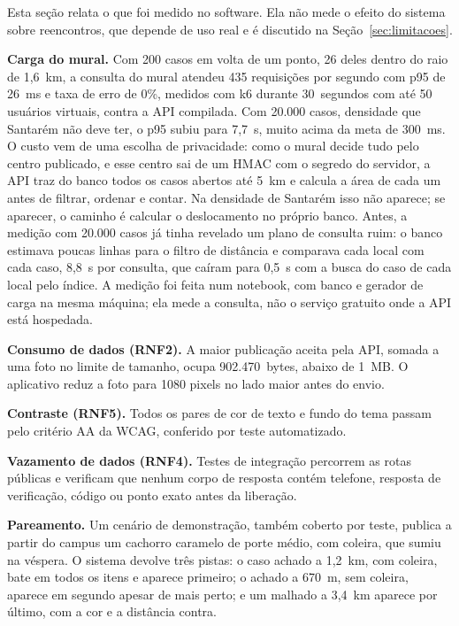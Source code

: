 \documentclass[12pt]{article}
\newcommand{\cargaPnoventaecinco}{26~ms} %
\newcommand{\cargaRequisicoes}{435}
\newcommand{\cargaVintemilPnoventaecinco}{7,7~s}
\newcommand{\cargaErros}{0\%}
\newcommand{\publicacaoBytes}{902.470~bytes}     %
\begin{document}
Esta seção relata o que foi medido no software. Ela não mede o efeito do sistema
sobre reencontros, que depende de uso real e é discutido na
Seção~\ref{sec:limitacoes}.

\textbf{Carga do mural.} Com 200 casos em volta de um ponto, 26 deles dentro do raio
de 1,6~km, a consulta do mural atendeu \cargaRequisicoes{} requisições por segundo
com p95 de \cargaPnoventaecinco{} e taxa de erro de \cargaErros{}, medidos com k6
durante 30~segundos com até 50 usuários virtuais, contra a API compilada. Com
20.000 casos, densidade que Santarém não deve ter, o p95 subiu para
\cargaVintemilPnoventaecinco{}, muito acima da meta de 300~ms. O custo vem de uma escolha
de privacidade: como o mural decide tudo pelo centro publicado, e esse centro sai de um
HMAC com o segredo do servidor, a API traz do banco todos os casos abertos até 5~km e
calcula a área de cada um antes de filtrar, ordenar e contar. Na densidade de Santarém
isso não aparece; se aparecer, o caminho é calcular o deslocamento no próprio banco.
Antes, a medição com 20.000 casos já tinha revelado um plano de consulta ruim: o banco
estimava poucas linhas para o filtro de distância e comparava cada local com cada caso,
8,8~s por consulta, que caíram para 0,5~s com a busca do caso de cada local pelo índice.
A medição foi feita num notebook, com banco e gerador de carga na mesma máquina; ela
mede a consulta, não o serviço gratuito onde a API está hospedada.

\textbf{Consumo de dados (RNF2).} A maior publicação aceita pela API, somada a uma
foto no limite de tamanho, ocupa \publicacaoBytes{}, abaixo de 1~MB. O aplicativo
reduz a foto para 1080 pixels no lado maior antes do envio.

\textbf{Contraste (RNF5).} Todos os pares de cor de texto e fundo do tema passam
pelo critério AA da WCAG, conferido por teste automatizado.

\textbf{Vazamento de dados (RNF4).} Testes de integração percorrem as rotas
públicas e verificam que nenhum corpo de resposta contém telefone, resposta de
verificação, código ou ponto exato antes da liberação.

\textbf{Pareamento.} Um cenário de demonstração, também coberto por teste,
publica a partir do campus um cachorro caramelo de porte médio, com coleira, que
sumiu na véspera. O sistema devolve três pistas: o caso achado a 1,2~km, com
coleira, bate em todos os itens e aparece primeiro; o achado a 670~m, sem coleira,
aparece em segundo apesar de mais perto; e um malhado a 3,4~km aparece por último,
com a cor e a distância contra.
\end{document}
